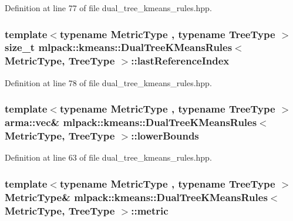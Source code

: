 Definition at line 77 of file dual\+\_\+tree\+\_\+kmeans\+\_\+rules.\+hpp.

\subsubsection[{last\+Reference\+Index}]{\setlength{\rightskip}{0pt plus 5cm}template$<$typename Metric\+Type , typename Tree\+Type $>$ size\+\_\+t {\bf mlpack\+::kmeans\+::\+Dual\+Tree\+K\+Means\+Rules}$<$ Metric\+Type, Tree\+Type $>$\+::last\+Reference\+Index\hspace{0.3cm}{\ttfamily [private]}}\label{classmlpack_1_1kmeans_1_1DualTreeKMeansRules_a127268a4630bc281f303e3dee88ef305}


Definition at line 78 of file dual\+\_\+tree\+\_\+kmeans\+\_\+rules.\+hpp.

\subsubsection[{lower\+Bounds}]{\setlength{\rightskip}{0pt plus 5cm}template$<$typename Metric\+Type , typename Tree\+Type $>$ arma\+::vec\& {\bf mlpack\+::kmeans\+::\+Dual\+Tree\+K\+Means\+Rules}$<$ Metric\+Type, Tree\+Type $>$\+::lower\+Bounds\hspace{0.3cm}{\ttfamily [private]}}\label{classmlpack_1_1kmeans_1_1DualTreeKMeansRules_ab4745550c57b988266f582b934c343c4}


Definition at line 63 of file dual\+\_\+tree\+\_\+kmeans\+\_\+rules.\+hpp.

\subsubsection[{metric}]{\setlength{\rightskip}{0pt plus 5cm}template$<$typename Metric\+Type , typename Tree\+Type $>$ Metric\+Type\& {\bf mlpack\+::kmeans\+::\+Dual\+Tree\+K\+Means\+Rules}$<$ Metric\+Type, Tree\+Type $>$\+::metric\hspace{0.3cm}{\ttfamily [private]}}\label{classmlpack_1_1kmeans_1_1DualTreeKMeansRules_a673c12aa5ca76ba32659a8e71053f8d3}


